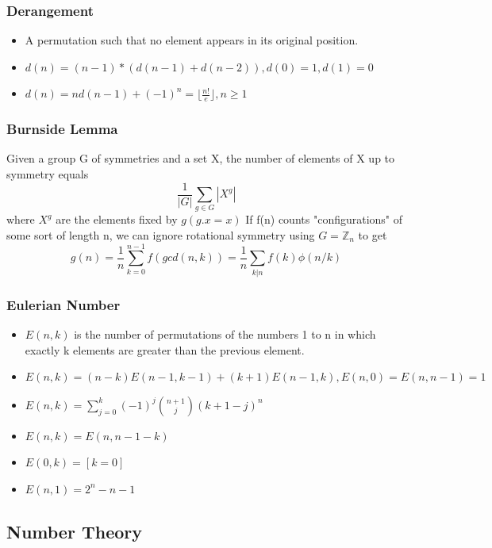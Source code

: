 \subsubsection{Derangement}
\vspace{2.5mm}
\begin{itemize}
    \item A permutation such that no element appears in its original position.
    \item $d(n) = (n-1)*(d(n-1)+d(n-2)),d(0) = 1, d(1) = 0$
    \item $d(n) =nd(n-1)+(-1)^n = \lfloor{\frac{n!}{e}}\rfloor, n\geq1$
\end{itemize}
\subsubsection{Burnside Lemma}
\vspace{2.5mm}
Given a group G of symmetries and a set X, the number of elements of X up to symmetry equals
$$\frac{1}{|G|} \sum\limits_{g \in G} |X^g|$$ where $X^g$ are the elements fixed by $g (g.x = x)$
If f(n) counts "configurations" of some sort of length n, we can ignore rotational symmetry using $G = \mathbb{Z}_n$ to get
$$g(n) = \frac{1}{n} \sum\limits_{k=0}^{n-1}f(gcd(n,k))= \frac{1}{n}\sum\limits_{k|n}f(k)\phi(n/k)$$

\subsubsection{Eulerian Number}
\vspace{2.5mm}
\begin{itemize}
    \item $E(n,k)$ is the number of permutations of the numbers 1 to n in which exactly k elements are greater than the previous element.
    \item $E(n,k) = (n-k)E(n-1, k-1)+(k+1)E(n-1,k), E(n,0) = E(n,n-1) = 1$
    \item $E(n,k) = \sum\limits_{j=0}^k (-1)^j \binom{n+1}{j}(k+1-j)^n$
    \item $E(n,k) = E(n, n-1-k)$
    \item $E(0,k) = [k=0]$
    \item $E(n,1) = 2^n - n - 1$
\end{itemize}

\subsection{Number Theory}
\vspace{2.5mm}
